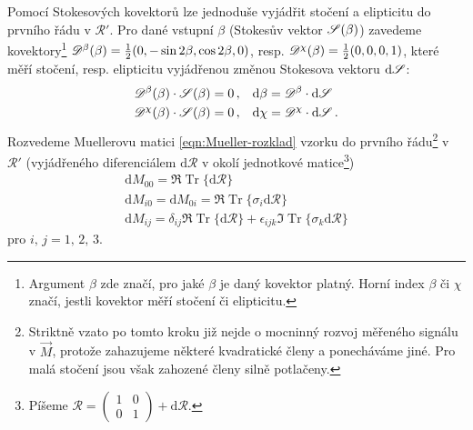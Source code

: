 Pomocí Stokesových kovektorů lze jednoduše vyjádřit stočení a elipticitu do prvního řádu v $\mathcal{R}'$.
Pro dané vstupní $\beta$ (Stokesův vektor $\mathscr{S}(\beta)$) zavedeme kovektory\footnote{Argument $\beta$ zde značí, pro jaké $\beta$ je daný kovektor platný. Horní index $\beta$ či $\chi$ značí, jestli kovektor měří stočení či elipticitu.} $\mathscr{D}^\beta(\beta)=\frac{1}{2}(0, -\sin2\beta, \cos2\beta, 0)$, resp. $\mathscr{D}^\chi(\beta)=\frac{1}{2}(0, 0, 0, 1)$, které měří stočení, resp. elipticitu vyjádřenou změnou Stokesova vektoru $\textrm{d}\mathscr{S}$:
\begin{align}
    \mathscr{D}^\beta(\beta) \cdot \mathscr{S}(\beta) = 0 \,, \quad &\textrm{d}\beta = \mathscr{D}^\beta \cdot \textrm{d}\mathscr{S} \\
    \mathscr{D}^\chi(\beta) \cdot \mathscr{S}(\beta) = 0 \,, \quad &\textrm{d}\chi = \mathscr{D}^\chi \cdot \textrm{d}\mathscr{S} \,.
\end{align}
Rozvedeme Muellerovu matici \eqref{eqn:Mueller-rozklad} vzorku do prvního řádu\footnote{Striktně vzato po tomto kroku již nejde o mocninný rozvoj měřeného signálu v $\vec{M}$, protože zahazujeme některé kvadratické členy a ponecháváme jiné. Pro malá stočení jsou však zahozené členy silně potlačeny.} v $\mathcal{R}'$ (vyjádřeného diferenciálem $\textrm{d}\mathcal{R}$ v okolí jednotkové matice\footnote{Píšeme $\mathcal{R}= \begin{pmatrix} 1&0\\0&1 \end{pmatrix} + \textrm{d}\mathcal{R}$.}) 
\begin{align}
\label{eqn:dif-Mueller}
\textrm{d}M_{00} = \Re \operatorname{Tr} \lbrace\textrm{d}\mathcal{R} \rbrace\\
    \textrm{d}M_{i0} = \textrm{d}M_{0i} = \Re \operatorname{Tr} \lbrace \sigma_i \textrm{d}\mathcal{R} \rbrace \\
    \textrm{d}M_{ij} = \delta_{ij} \Re\operatorname{Tr}\lbrace\textrm{d}\mathcal{R}\rbrace + \epsilon_{ijk} \Im\operatorname{Tr}\lbrace\sigma_k\textrm{d}\mathcal{R}\rbrace
\end{align}
pro $i,\,j = 1,\,2,\,3$.

